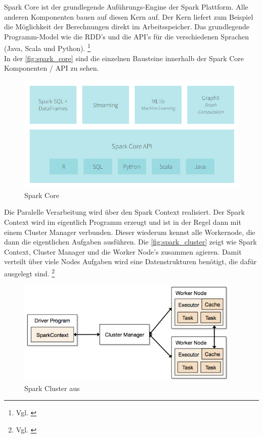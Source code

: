 Spark Core ist der grundlegende Auführungs-Engine der Spark Plattform. Alle anderen Komponenten bauen auf diesen Kern auf.
Der Kern liefert zum Beispiel die Möglichkeit der Berechnungen direkt im Arbeitsspeicher. 
Das grundlegende Programm-Model wie die RDD's und die API's für die verschiedenen Sprachen (Java, Scala und Python).  \footnote{Vgl. \cite{DATABRICK_ABOUT}} \\
In der \autoref{fig:spark_core} sind die einzelnen Bausteine innerhalb der Spark Core Komponenten / API zu sehen. 
 
\begin{figure}[h]
  \centering
  \includegraphics[width=\textwidth]{./bilder/spark_core.png}
  \caption{Spark Core}\label{fig:spark_core}
\end{figure}

\noindent
Die Paralelle Verarbeitung wird über den Spark Context realisiert. Der Spark Context wird im eigentlich Programm erzeugt und ist in der Regel dann mit einem Cluster Manager verbunden. Dieser wiederum kennst alle Workernode, die dann die eigentlichen Aufgaben ausführen. Die \autoref{fig:spark_cluster} zeigt wie Spark Context, Cluster Manager und die Worker Node's zusammen agieren. Damit verteilt über viele Nodes Aufgaben wird eine Datenstrukturen benötigt, die dafür ausgelegt sind. \footnote{Vgl. \cite[101]{BDS16}}

\begin{figure}[h]
  \centering
  \includegraphics[width=\textwidth,height=50mm]{./bilder/cluster-overview.png}
  \caption{Spark Cluster aus \cite{SPCLUSTER}}\label{fig:spark_cluster}
\end{figure}




